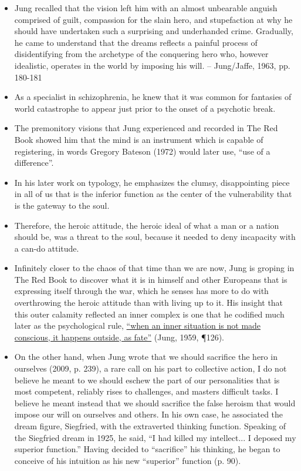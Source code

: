 \begin{itemize}

\item Jung recalled that the vision left him with an almost unbearable anguish
comprised of guilt, compassion for the slain hero, and stupefaction at why he
should have undertaken such a surprising and underhanded crime. Gradually, he
came to understand that the dreams reflects a painful process of disidentifying
from the archetype of the conquering hero who, however idealistic, operates in
the world by imposing his will. -- Jung/Jaffe, 1963, pp. 180-181

\item As a specialist in schizophrenia, he knew that it was common for
fantasies of world catastrophe to appear just prior to the onset of a psychotic
break.

\item The premonitory visions that Jung experienced and recorded in The Red Book
showed him that the mind is an instrument which is capable of registering,
in words Gregory Bateson (1972) would later use, ``use of a difference''.

\item In his later work on typology, he emphasizes the clumsy, disappointing
piece in all of us that is the inferior function as the center of the
vulnerability that is the gateway to the soul.

\item Therefore, the heroic attitude, the heroic ideal of what a man or a
nation should be, was a threat to the soul, because it needed to deny
incapacity with a can-do attitude.

\item Infinitely closer to the chaos of that time than we are now, Jung is
groping in The Red Book to discover what it is in himself and other Europeans
that is expressing itself through the war, which he senses has more to do with
overthrowing the heroic attitude than with living up to it. His insight that
this outer calamity reflected an inner complex is one that he codified much
later as the psychological rule, \ul{``when an inner situation is not made
conscious, it happens outside, as fate''} (Jung, 1959, \P 126).

\item On the other hand, when Jung wrote that we should sacrifice the hero in
ourselves (2009, p. 239), a rare call on his part to collective action, I do
not believe he meant to we should eschew the part of our personalities that is
most competent, reliably rises to challenges, and masters difficult tasks. I
believe he meant instead that we should sacrifice the false heroism that would
impose our will on ourselves and others. In his own case, he associated the
dream figure, Siegfried, with the extraverted thinking function. Speaking of
the Siegfried dream in 1925, he said, ``I had killed my intellect...  I deposed
my superior function.'' Having decided to ``sacrifice'' his thinking, he began
to conceive of his intuition as his new ``superior'' function (p. 90).


\end{itemize}
